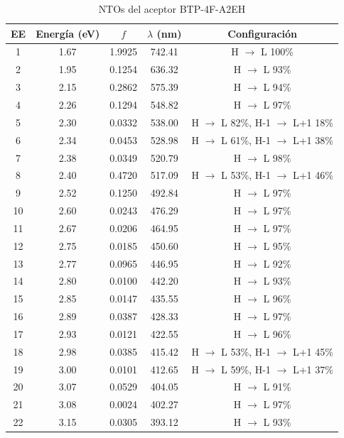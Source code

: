 \begin{table}[H]
\caption{NTOs del aceptor BTP-4F-A2EH}
\label{table:R25B-7} \vspace{-0.5cm}
{\footnotesize
\begin{center} 
\begin{tabular}{ccccc}
\hline
EE & Energía (eV) & $f$ & $\lambda$ (nm) & Configuración \\ \hline
1 & 1.67 & 1.9925 & 742.41 & H $\rightarrow$ L 100\% \\
2 & 1.95 & 0.1254 & 636.32 & H $\rightarrow$ L 93\% \\
3 & 2.15 & 0.2862 & 575.39 & H $\rightarrow$ L 94\% \\
4 & 2.26 & 0.1294 & 548.82 & H $\rightarrow$ L 97\% \\
5 & 2.30 & 0.0332 & 538.00 & H $\rightarrow$ L 82\%, H-1 $\rightarrow$ L+1 18\% \\
6 & 2.34 & 0.0453 & 528.98 & H $\rightarrow$ L 61\%, H-1 $\rightarrow$ L+1 38\% \\
7 & 2.38 & 0.0349 & 520.79 & H $\rightarrow$ L 98\% \\
8 & 2.40 & 0.4720 & 517.09 & H $\rightarrow$ L 53\%, H-1 $\rightarrow$ L+1 46\% \\
9 & 2.52 & 0.1250 & 492.84 & H $\rightarrow$ L 97\% \\
10 & 2.60 & 0.0243 & 476.29 & H $\rightarrow$ L 97\% \\
11 & 2.67 & 0.0206 & 464.95 & H $\rightarrow$ L 97\% \\
12 & 2.75 & 0.0185 & 450.60 & H $\rightarrow$ L 95\% \\
13 & 2.77 & 0.0965 & 446.95 & H $\rightarrow$ L 92\% \\
14 & 2.80 & 0.0100 & 442.20 & H $\rightarrow$ L 93\% \\
15 & 2.85 & 0.0147 & 435.55 & H $\rightarrow$ L 96\% \\
16 & 2.89 & 0.0387 & 428.33 & H $\rightarrow$ L 97\% \\
17 & 2.93 & 0.0121 & 422.55 & H $\rightarrow$ L 96\% \\
18 & 2.98 & 0.0385 & 415.42 & H $\rightarrow$ L 53\%, H-1 $\rightarrow$ L+1 45\% \\
19 & 3.00 & 0.0101 & 412.65 & H $\rightarrow$ L 59\%, H-1 $\rightarrow$ L+1 37\% \\
20 & 3.07 & 0.0529 & 404.05 & H $\rightarrow$ L 91\% \\
21 & 3.08 & 0.0024 & 402.27 & H $\rightarrow$ L 97\% \\
22 & 3.15 & 0.0305 & 393.12 & H $\rightarrow$ L 93\% \\

\end{tabular}
\end{center}}
\end{table}
